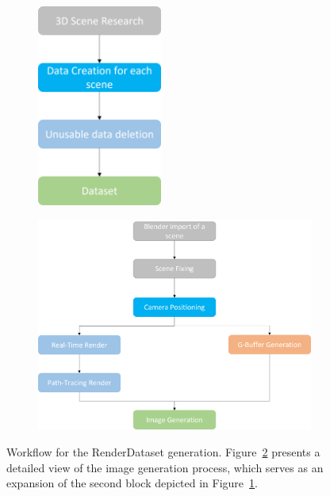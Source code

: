 \begin{figure}[!h]
\centering
    \begin{subfigure}{0.45\linewidth}
        \centering
         \includegraphics[width=0.45\textwidth]{figures/methods/WorkflowGeneraleCreazioneDataset.png}
         \caption{}
         \label{fig:rendering_dataset_generation_complete}
    \end{subfigure}
    \hfill
    \begin{subfigure}{0.45\linewidth}
        \centering
         \includegraphics[width=\textwidth]{figures/methods/WorkflowGenerazioneImmaginiBlender.png}
         \caption{}
         \label{fig:rendering_dataset_generation_image}
    \end{subfigure}
\caption[Workflow RenderDataset generalization]{Workflow for the RenderDataset generation. Figure~\ref{fig:rendering_dataset_generation_image} presents a detailed view of the image generation process, which serves as an expansion of the second block depicted in Figure~\ref{fig:rendering_dataset_generation_complete}.}
\label{fig:render_dataset_generation}
\end{figure}

